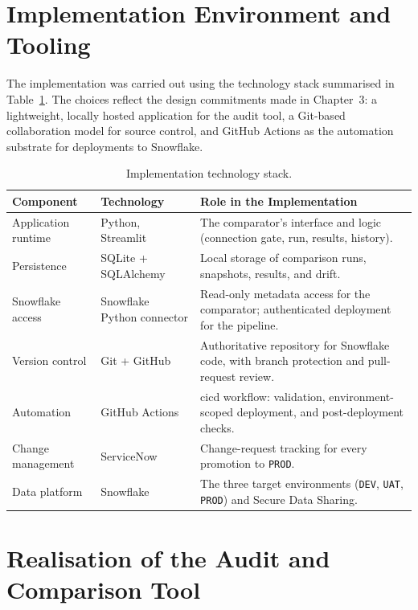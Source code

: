 \section{Implementation Environment and Tooling}
\label{sec:impl-env}

The implementation was carried out using the technology stack summarised in Table~\ref{tab:impl-stack}. The choices reflect the design commitments made in Chapter~3: a lightweight, locally hosted application for the audit tool, a Git-based collaboration model for source control, and GitHub Actions as the automation substrate for deployments to Snowflake.

\begin{table}[H]
  \centering
  \begin{tabularx}{\textwidth}{l l X}
    \toprule
    \rowcolor{ibmblue!15}
    \textbf{Component} & \textbf{Technology} & \textbf{Role in the Implementation} \\
    \midrule
    Application runtime & Python, Streamlit & The comparator's interface and logic (connection gate, run, results, history). \\
    Persistence & SQLite + SQLAlchemy & Local storage of comparison runs, snapshots, results, and drift. \\
    Snowflake access & Snowflake Python connector & Read-only metadata access for the comparator; authenticated deployment for the pipeline. \\
    Version control & Git + GitHub & Authoritative repository for Snowflake code, with branch protection and pull-request review. \\
    Automation & GitHub Actions & \gls{cicd} workflow: validation, environment-scoped deployment, and post-deployment checks. \\
    Change management & ServiceNow & Change-request tracking for every promotion to \texttt{PROD}. \\
    Data platform & Snowflake & The three target environments (\texttt{DEV}, \texttt{UAT}, \texttt{PROD}) and Secure Data Sharing. \\
    \bottomrule
  \end{tabularx}
  \caption{Implementation technology stack.}
  \label{tab:impl-stack}
\end{table}

\section{Realisation of the Audit and Comparison Tool}
\label{sec:impl-comparator}

